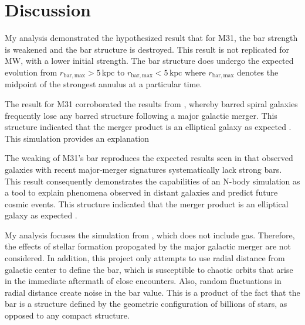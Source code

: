 \documentclass[twocolumn]{aastex631}
\begin{document}
\section{Discussion}

My analysis demonstrated the hypothesized result that for M31, the bar
strength is weakened and the bar structure is destroyed. This result
is not replicated for MW, with a lower initial strength. The bar
structure does undergo the expected evolution from
$r_\mathrm{bar,max} > 5\,\mathrm{kpc}$ to $r_\mathrm{bar,max} < 5\,\mathrm{kpc}$ where
$r_\mathrm{bar,max}$ denotes the midpoint of the strongest annulus at a
particular time.

The result for M31 corroborated the results from \citet{elmegreen:07},
whereby barred spiral galaxies frequently lose any barred structure
following a major galactic merger. This structure indicated that the
merger product is an elliptical galaxy as expected
\citep[e.g.,][]{mutch:11}. This simulation provides an explanation

The weaking of M31’s bar reproduces the expected results seen in
\citet{elmegreen:07} that observed galaxies with recent major‐merger
signatures systematically lack strong bars. This result consequently
demonstrates the capabilities of an N-body simulation as a tool to
explain phenomena observed in distant galaxies and predict future
cosmic events. This structure indicated that the
merger product is an elliptical galaxy as expected
\citep[e.g.,][]{mutch:11}.

My analysis focuses the simulation from \citet{vandermarel:12}, which
does not include gas. Therefore, the effects of stellar formation
propogated by the major galactic merger are not considered. In
addition, this project only attempts to use radial distance from
galactic center to define the bar, which is susceptible to chaotic
orbits that arise in the immediate aftermath of close
encounters. Also, random fluctuations in radial distance create noise
in the bar value. This is a product of the fact that the bar is a
structure defined by the geometric configuration of billions of stars,
as opposed to any compact structure.



\end{document}
